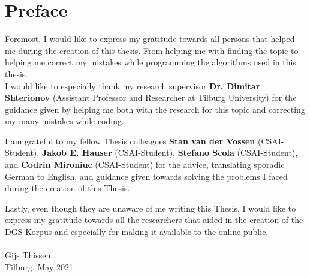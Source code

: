
\section*{Preface}

Foremost, I would like to express my gratitude towards all persons that helped me during the creation of this thesis. From helping me with finding the topic to helping me correct my mistakes while programming the algorithms used in this thesis. 
\\

I would like to especially thank my research supervisor \textbf{Dr. Dimitar Shterionov} (Assistant Professor and Researcher at Tilburg University) for the guidance given by helping me both with the research for this topic and correcting my many mistakes while coding. 

I am grateful to my fellow Thesis colleagues \textbf{Stan van der Vossen} (CSAI-Student), \textbf{Jakob E. Hauser} (CSAI-Student), \textbf{Stefano Scola} (CSAI-Student), and \textbf{Codrin Mironiuc} (CSAI-Student) for the advice, translating sporadic German to English, and guidance given towards solving the problems I faced during the creation of this Thesis.

Lastly, even though they are unaware of me writing this Thesis, I would like to express my gratitude towards all the researchers that aided in the creation of the DGS-Korpus and especially for making it available to the online public. \\ \\
\hfill
Gijs Thissen \\
Tilburg, May 2021


